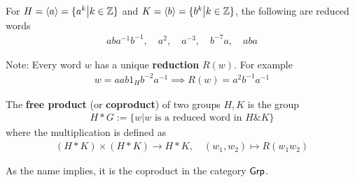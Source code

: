 \begin{ex}[]
  For $H = \langle a\rangle = \{a^{k} \big\vert k \in \mathbb{Z}\}$ and $K = \langle b\rangle = \{b^{k} \big\vert k \in \mathbb{Z}\}$, the following are reduced words
  \begin{align*}
    aba^{-1}b^{-1}, \quad a^{2}, \quad a^{-3}, \quad b^{-7}a, \quad aba
  \end{align*}
\end{ex}
Note: Every word $w$ has a unique \textbf{reduction} $R(w)$. For example
\begin{align*}
  w = aab1_Hb^{-2}a^{-1} \implies R(w) = a^{2}b^{-1}a^{-1}
\end{align*}

\begin{dfn}[]
  The \textbf{free product} (or \textbf{coproduct}) of two groups $H,K$ is the group
\begin{align*}
  H \ast G := \{w \big\vert w \text{ is a reduced word in } H\& K\}
\end{align*}
where the multiplication is defined as
\begin{align*}
  (H \ast K) \times (H \ast K) \to H \ast K, \quad (w_1,w_2) \mapsto R(w_1w_2)
\end{align*}
\end{dfn}
As the name implies, it is the coproduct in the category $\text{\sffamily Grp}$.

